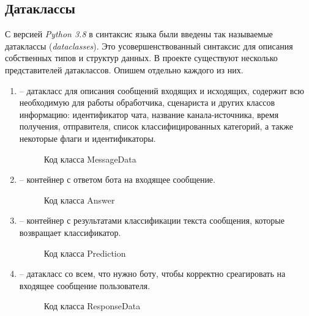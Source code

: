     \subsection{Датаклассы}
    С версией \textit{Python 3.8} в синтаксис языка были введены так называемые
    датаклассы (\textit{dataclasses}).
    Это усовершенствованный синтаксис для описания собственных типов и структур данных.
    В проекте существуют несколько представителей датаклассов. Опишем отдельно каждого из них.
    \begin{enumerate}
        \item {} -- датакласс для описания сообщений входящих и исходящих,
        содержит всю необходимую для работы обработчика, сценариста и других классов информацию:
        идентификатор чата, название канала-источника, время получения, отправителя,
        список классифицированных категорий, а также некоторые флаги и идентификаторы.

        \begin{figure}[H]
            \centering
            
            \caption{Код класса MessageData}
            \label{fig:messagedata}
        \end{figure}

        \item {} -- контейнер с ответом бота на входящее сообщение.

        \begin{figure}[H]
            \centering
            
            \caption{Код класса Answer}
            \label{fig:answer}
        \end{figure}

        \item {} -- контейнер с результатами классификации текста сообщения,
        которые возвращает классификатор.

        \begin{figure}[H]
            \centering
            
            \caption{Код класса Prediction}
            \label{fig:prediction}
        \end{figure}

        \item {} -- датакласс со всем, что нужно боту, чтобы корректно
        среагировать на входящее сообщение пользователя.

        \begin{figure}[H]
            \centering
            
            \caption{Код класса ResponseData}
            \label{fig:responsedata}
        \end{figure}

    \end{enumerate}

